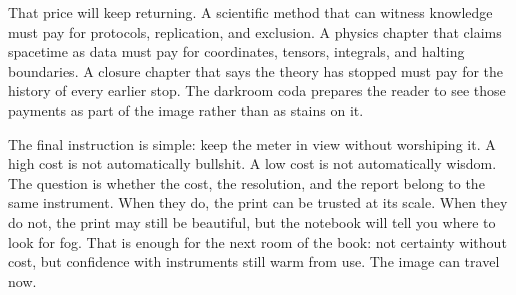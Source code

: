 That price will keep returning. A scientific method that can witness knowledge
must pay for protocols, replication, and exclusion. A physics chapter that
claims spacetime as data must pay for coordinates, tensors, integrals, and
halting boundaries. A closure chapter that says the theory has stopped must
pay for the history of every earlier stop. The darkroom coda prepares the
reader to see those payments as part of the image rather than as stains on it.

The final instruction is simple: keep the meter in view without worshiping it.
A high cost is not automatically bullshit. A low cost is not automatically
wisdom. The question is whether the cost, the resolution, and the report belong
to the same instrument. When they do, the print can be trusted at its scale.
When they do not, the print may still be beautiful, but the notebook will tell
you where to look for fog. That is enough for the next room of the book: not
certainty without cost, but confidence with instruments still warm from use.
The image can travel now.
